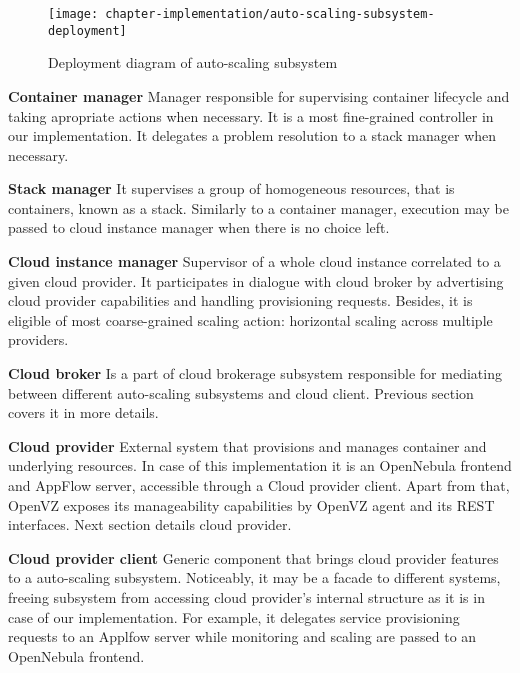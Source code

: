 \begin{figure}[!ht]
  \begin{center}
    \texttt{[image: chapter-implementation/auto-scaling-subsystem-deployment]}
  \end{center}
  \caption{Deployment diagram of auto-scaling subsystem}
  \label{fig:auto-scaling-subsystem-deployment}
\end{figure}

\begin{asparaenum}
 \item[\textbf{Container manager}] Manager responsible for supervising container lifecycle and taking apropriate actions when necessary. It is a most fine-grained controller in our implementation. It delegates a problem resolution to a stack manager when necessary.
 
 \item[\textbf{Stack manager}] It supervises a group of homogeneous resources, that is containers, known as a stack. Similarly to a container manager, execution may be passed to cloud instance manager when there is no choice left.
 
 \item[\textbf{Cloud instance manager}] Supervisor of a whole cloud instance correlated to a given cloud provider. It participates in dialogue with cloud broker by advertising cloud provider capabilities and handling provisioning requests. Besides, it is eligible of most coarse-grained scaling action: horizontal scaling across multiple providers.
 
 \item[\textbf{Cloud broker}] Is a part of cloud brokerage subsystem responsible for mediating between different auto-scaling subsystems and cloud client. Previous section covers it in more details.
 
 \item[\textbf{Cloud provider}] External system that provisions and manages container and underlying resources. In case of this implementation it is an OpenNebula frontend and AppFlow server, accessible through a Cloud provider client. Apart from that, OpenVZ exposes its manageability capabilities by OpenVZ agent and its REST interfaces. Next section details cloud provider.
 
 \item[\textbf{Cloud provider client}] Generic component that brings cloud provider features to a auto-scaling subsystem. Noticeably, it may be a facade to different systems, freeing subsystem from accessing cloud provider's internal structure as it is in case of our implementation. For example, it delegates service provisioning requests to an Applfow server while monitoring and scaling are passed to an OpenNebula frontend.
\end{asparaenum}




